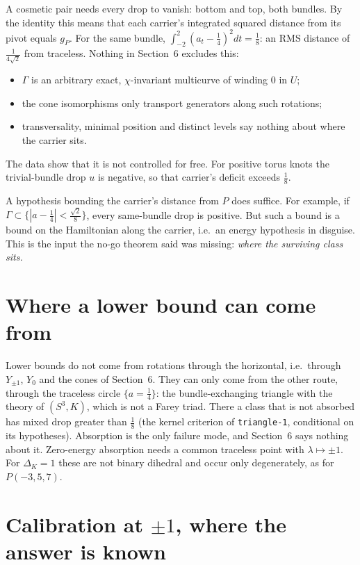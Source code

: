 \documentclass[10pt]{amsart}
\begin{document}
A cosmetic pair needs every drop to vanish: bottom and top, both bundles. By the
identity this means that each carrier's integrated squared distance from its
pivot equals $g_P$. For the same bundle, $\int_{-2}^2(a_t-\frac14)^2dt=\frac18$:
an RMS distance of $\frac1{4\sqrt2}$ from traceless. Nothing in Section~6 excludes
this:
\begin{itemize}
\item $\Gamma$ is an arbitrary exact, $\chi$-invariant multicurve of winding $0$ in $U$;
\item the cone isomorphisms only transport generators along such rotations;
\item transversality, minimal position and distinct levels say nothing about
where the carrier sits.
\end{itemize}
The data show that it is not controlled for free. For positive torus knots the
trivial-bundle drop $u$ is negative, so that carrier's deficit exceeds $\frac18$.

A hypothesis bounding the carrier's distance from $P$ does suffice. For example,
if $\Gamma\subset\{|a-\frac14|<\frac{\sqrt2}8\}$, every same-bundle drop is positive.
But such a bound is a bound on the Hamiltonian along the carrier, i.e.\ an energy
hypothesis in disguise. This is the input the no-go theorem said was missing:
\emph{where the surviving class sits.}

\section{Where a lower bound can come from}

Lower bounds do not come from rotations through the horizontal, i.e.\ through
$Y_{\pm1}$, $Y_0$ and the cones of Section~6. They can only come from the other
route, through the traceless circle $\{a=\frac14\}$: the bundle-exchanging triangle
with the theory of $(S^3,K)$, which is not a Farey triad. There a class that is not
absorbed has mixed drop greater than $\frac18$ (the kernel criterion of
\texttt{triangle-1}, conditional on its hypotheses). Absorption
is the only failure mode, and Section~6 says nothing about it. Zero-energy
absorption needs a common traceless point with $\lambda\mapsto\pm1$. For
$\Delta_K=1$ these are not binary dihedral and occur only degenerately, as for
$P(-3,5,7)$.

\section{Calibration at $\pm1$, where the answer is known}
\end{document}
